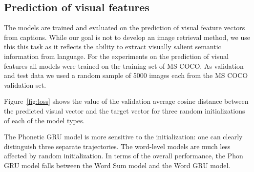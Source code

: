 \subsection{Prediction of visual features}
\label{subsec:visual}
The models are trained and evaluated on the prediction of visual
feature vectors from captions. While our goal is not to develop an
image retrieval method, we use this this task as it reflects the ability to extract visually salient semantic information from language.
For the experiments on the prediction of visual features all models
were trained on the training set of MS COCO. As validation and test data we
used a random sample of 5000 images each from the MS COCO validation set. 

Figure~\ref{fig:loss} shows the value of the validation average cosine distance
between the predicted visual vector and the target vector for three
random initializations of each of the model types. 

The Phonetic GRU model is more sensitive to the initialization: one
can clearly distinguish three separate trajectories. The word-level models
are much less affected by random initialization. In terms of the
overall performance, the {\sc Phon GRU} model falls between the
{\sc Word Sum} model and the {\sc Word GRU} model.

